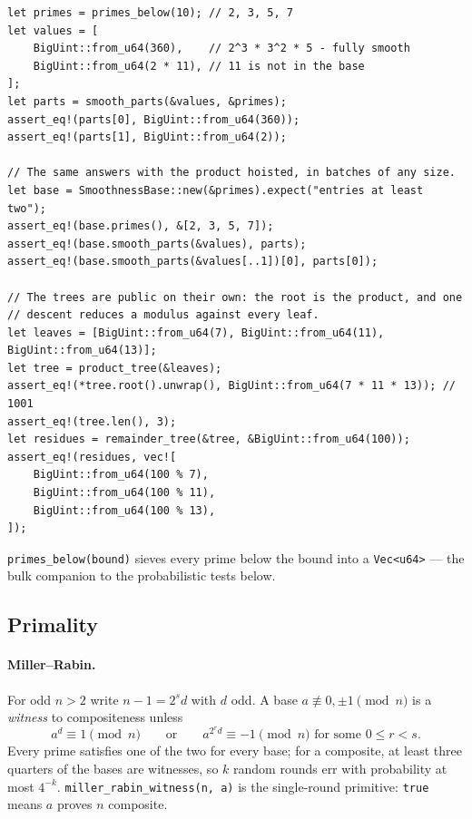 \documentclass[11pt]{article}
\newcommand{\code}[1]{\texttt{#1}}
\begin{document}
\begin{lstlisting}
let primes = primes_below(10); // 2, 3, 5, 7
let values = [
    BigUint::from_u64(360),    // 2^3 * 3^2 * 5 - fully smooth
    BigUint::from_u64(2 * 11), // 11 is not in the base
];
let parts = smooth_parts(&values, &primes);
assert_eq!(parts[0], BigUint::from_u64(360));
assert_eq!(parts[1], BigUint::from_u64(2));

// The same answers with the product hoisted, in batches of any size.
let base = SmoothnessBase::new(&primes).expect("entries at least two");
assert_eq!(base.primes(), &[2, 3, 5, 7]);
assert_eq!(base.smooth_parts(&values), parts);
assert_eq!(base.smooth_parts(&values[..1])[0], parts[0]);

// The trees are public on their own: the root is the product, and one
// descent reduces a modulus against every leaf.
let leaves = [BigUint::from_u64(7), BigUint::from_u64(11), BigUint::from_u64(13)];
let tree = product_tree(&leaves);
assert_eq!(*tree.root().unwrap(), BigUint::from_u64(7 * 11 * 13)); // 1001
assert_eq!(tree.len(), 3);
let residues = remainder_tree(&tree, &BigUint::from_u64(100));
assert_eq!(residues, vec![
    BigUint::from_u64(100 % 7),
    BigUint::from_u64(100 % 11),
    BigUint::from_u64(100 % 13),
]);
\end{lstlisting}

\code{primes\_below(bound)} sieves every prime below the bound into a
\code{Vec<u64>} --- the bulk companion to the probabilistic tests below.

\subsection{Primality}
\label{sec:primality}

\paragraph{Miller--Rabin.} For odd $n > 2$ write $n - 1 = 2^s d$ with $d$
odd. A base $a \not\equiv 0, \pm 1 \pmod n$ is a \emph{witness} to
compositeness unless
\begin{equation}
a^d \equiv 1 \pmod{n}
\qquad\text{or}\qquad
a^{2^r d} \equiv -1 \pmod{n} \text{ for some } 0 \le r < s .
\end{equation}
Every prime satisfies one of the two for every base; for a composite, at
least three quarters of the bases are witnesses, so $k$ random rounds err
with probability at most $4^{-k}$. \code{miller\_rabin\_witness(n, a)} is the
single-round primitive: \code{true} means $a$ proves $n$ composite.
\end{document}
